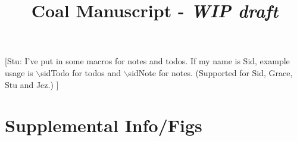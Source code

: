 \documentclass{article}
\title{Coal Manuscript - \textit{WIP draft}}
\author{}
\date{}
\newcommand{\stuTodo}[1]{{\color{magenta}[Stu: {#1}]}}
\begin{document}
\maketitle



% 
% 


\stuTodo{I've put in some macros for notes and todos. If my name is Sid, example usage is $\backslash$sidTodo for todos and $\backslash$sidNote for notes. (Supported for Sid, Grace, Stu and Jez.) }














\section{Supplemental Info/Figs}




\end{document}
